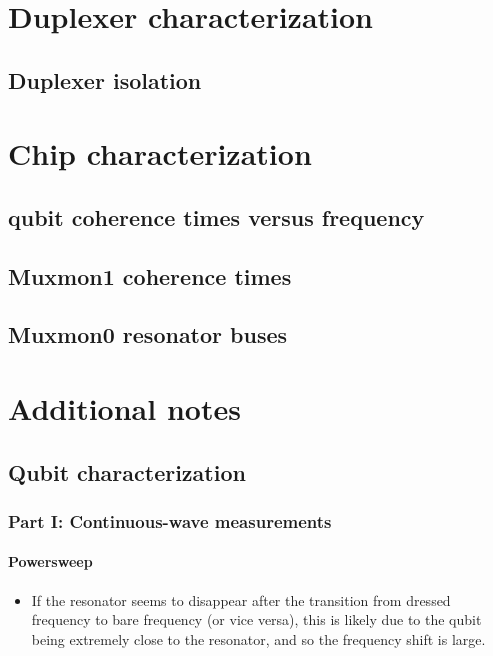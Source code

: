 

\chapter{Duplexer characterization}
  \section{Duplexer isolation}
  \label{ch:Duplexer isolation}

\chapter{Chip characterization}
  \section{qubit coherence times versus frequency}
  \section{Muxmon1 coherence times}
    \label{sec:Muxmon1 coherence times}
  \section{Muxmon0 resonator buses}
    \label{sec:Resonator buses}

\chapter{Additional notes}
  \section{Qubit characterization}
    \subsection{Part I: Continuous-wave measurements}
      \subsubsection{Powersweep}
        \begin{itemize}
          \item If the resonator seems to disappear after the transition from dressed frequency to bare frequency (or vice versa), this is likely due to the qubit being extremely close to the resonator, and so the frequency shift is large.
        \end{itemize}
